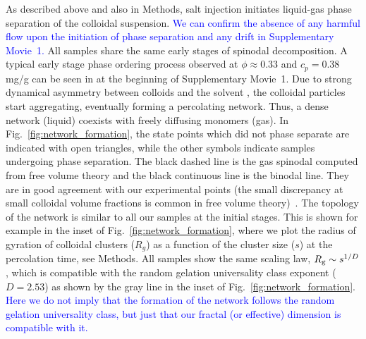 \documentclass[preprint,amsmath,amssymb,superscriptaddress]{revtex4-1}
\begin{document}
As described above and also in Methods, salt injection initiates liquid-gas phase separation of the colloidal suspension. 
\textcolor{blue}{We can confirm the absence of any harmful flow upon the initiation of phase separation and any drift in 
Supplementary Movie~1.}  
All samples share the same early stages of spinodal decomposition. 
A typical early stage phase ordering process observed at $\phi\approx 0.33$ and $c_p=0.38$ mg/g can be seen in at the beginning of Supplementary Movie~1. 
Due to strong dynamical asymmetry between colloids and the solvent \cite{tanaka1999colloid}, the colloidal particles start aggregating, 
eventually forming a percolating network. Thus, a dense network (liquid) coexists with freely diffusing monomers (gas).
In Fig.~\ref{fig:network_formation}, the state points which did not phase separate are indicated with open triangles, while
the other symbols indicate samples undergoing phase separation. The black dashed line is the gas spinodal computed from free volume theory and the 
black continuous line is the binodal line. They are in good agreement with our experimental points (the small discrepancy at small colloidal volume fractions 
is common in free volume theory)~\cite{Royall2007,lu2008gelation}.
The topology of the network is similar to all our samples at the initial stages. 
This is shown for example in the inset of Fig.~\ref{fig:network_formation}, where we plot the radius of gyration of colloidal clusters ($R_g$)
as a function of the cluster size ($s$) at the percolation time, see Methods. All samples show the same scaling law, $R_{\rm g}\sim s^{1/D}$, which is compatible with
the random gelation universality class exponent ($D=2.53$) as shown by the gray line in the inset of Fig.~\ref{fig:network_formation}. \textcolor{blue}{Here we do not imply that the formation of the network follows the random gelation universality class, but just that our
fractal (or effective) dimension is compatible with it.}

\end{document}
